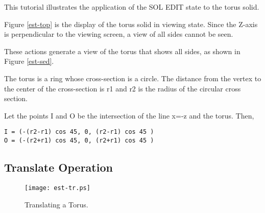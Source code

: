 This tutorial illustrates the application of the SOL EDIT state to the
torus solid.


Figure \ref{est-top} is the display of the torus solid in viewing state.
Since the
Z-axis is perpendicular to the viewing screen, a view of all sides cannot be
seen.


These actions generate a view of the torus that shows all sides,
as shown in Figure \ref{est-sed}.


The torus is a ring whose cross-section is a circle.  The distance from
the vertex to the center of the cross-section is r1 and r2 is the radius of
the circular cross section.

Let the points I and O be the intersection of the line x=-z and the torus.
Then,
\begin{center}
\begin{verbatim}
I = (-(r2-r1) cos 45, 0, (r2-r1) cos 45 )
O = (-(r2+r1) cos 45, 0, (r2+r1) cos 45 )
\end{verbatim}
\end{center}

\subsection{Translate Operation}

\begin{figure}
\centering \texttt{[image: est-tr.ps]}
\caption{Translating a Torus.}
\label{est-tr}
\end{figure}

